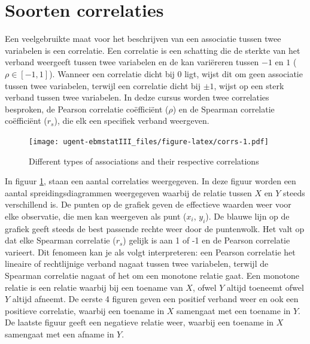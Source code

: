 \documentclass[
]{book}
\theoremstyle{definition}
\theoremstyle{definition}
\theoremstyle{definition}
\theoremstyle{definition}
\theoremstyle{remark}
\begin{document}
\hypertarget{soorten-correlaties}{%
\section*{Soorten correlaties}\label{soorten-correlaties}}


Een veelgebruikte maat voor het beschrijven van een associatie tussen twee variabelen is een correlatie. Een correlatie is een schatting die de sterkte van het verband weergeeft tussen twee variabelen en de kan variëreren tussen \(-1\) en \(1\) (\(\rho \in [-1, 1]\)). Wanneer een correlatie dicht bij \(0\) ligt, wijst dit om geen associatie tussen twee variabelen, terwijl een correlatie dicht bij \(\pm 1\), wijst op een sterk verband tussen twee variabelen. In dedze cursus worden twee correlaties besproken, de Pearson correlatie coëfficiënt (\(\rho\)) en de Spearman correlatie coëfficiënt (\(r_s\)), die elk een specifiek verband weergeven.

\begin{figure}
\centering
\texttt{[image: ugent-ebmstatIII\_files/figure-latex/corrs-1.pdf]}
\caption{\label{fig:corrs}Different types of associations and their respective correlations}
\end{figure}

In figuur \ref{fig:corrs}, staan een aantal correlaties weergegeven. In deze figuur worden een aantal spreidingsdiagrammen weergegeven waarbij de relatie tussen \(X\) en \(Y\) steeds verschillend is. De punten op de grafiek geven de effectieve waarden weer voor elke observatie, die men kan weergeven als punt (\(x_i\), \(y_i\)). De blauwe lijn op de grafiek geeft steeds de best passende rechte weer door de puntenwolk. Het valt op dat elke Spearman correlatie (\(r_s\)) gelijk is aan 1 of -1 en de Pearson correlatie varieert. Dit fenomeen kan je als volgt interpreteren: een Pearson correlatie het lineaire of rechtlijnige verband nagaat tussen twee variabelen, terwijl de Spearman correlatie nagaat of het om een monotone relatie gaat. Een monotone relatie is een relatie waarbij bij een toename van \(X\), ofwel \(Y\) altijd toeneemt ofwel \(Y\) altijd afneemt. De eerste 4 figuren geven een positief verband weer en ook een positieve correlatie, waarbij een toename in \(X\) samengaat met een toename in \(Y\). De laatste figuur geeft een negatieve relatie weer, waarbij een toename in \(X\) samengaat met een afname in \(Y\).
\end{document}
